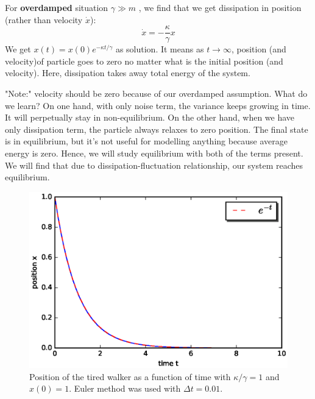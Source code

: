 \documentclass[11pt,a4paper]{article}
\begin{document}
For \textbf{overdamped} situation $\gamma  \gg m$ , we find that we get dissipation in position (rather than velocity $\dot{x}$):
\begin{equation}
\dot{x}= - \frac{\kappa}{\gamma} x 
\end{equation}
We get $x(t)=x(0) e^{-\kappa t/\gamma}$ as solution. It means as $t\rightarrow \infty$, position  (and velocity)of particle goes to zero no matter what is the initial position (and velocity). Here, dissipation takes away total energy of the system. 

"Note:" velocity should be zero because of our overdamped assumption.
What do we learn? On one hand, with only noise term, the variance keeps growing in time. It will perpetually stay in non-equilibrium. On the other hand, when we have only dissipation term, the particle always relaxes to zero position. The final state is in equilibrium, but it's not useful for modelling anything because average energy is zero. Hence, we will study equilibrium with both of the terms present. We will find that due to dissipation-fluctuation relationship, our system reaches equilibrium.



\begin{figure}[!htbp]
\centering
\includegraphics[scale=0.67]{tired_walker.eps}
\caption{ Position of the tired walker as a function of time with $\kappa/\gamma=1$ and $x(0)=1$. Euler method was used with $\Delta t=0.01$.  }
\label{meanx_tired}
\end{figure}
\end{document}
